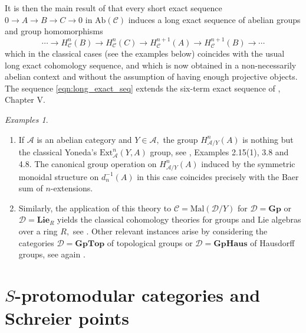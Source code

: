 \documentclass[11pt]{amsart}
\theoremstyle{plain}
\theoremstyle{definition}
\theoremstyle{remark}
\newtheorem{examples}[subsubsection]{Examples}
\begin{document}
It is then the main result of \cite{bourn-rodelo} that every short exact sequence $0\rightarrow A\rightarrow B \rightarrow C \rightarrow 0$ in $\mathrm{Ab}(\mathcal{C})$ induces a long exact sequence of abelian groups and group homomorphisms
\begin{equation}
\label{eqn:long_exact_seq}
\cdots \rightarrow H^{n}_{\mathcal{C}}(B) \rightarrow H^{n}_{\mathcal{C}}(C)\rightarrow H^{n+1}_{\mathcal{C}}(A) \rightarrow H^{n+1}_{\mathcal{C}}(B) \rightarrow \cdots
\end{equation}
which in the classical cases (see the examples below) coincides with the usual long exact cohomology sequence, and which is now obtained in a non-necessarily abelian context and without the assumption of having enough projective objects. The sequence \eqref{eqn:long_exact_seq} extends the six-term exact sequence of \cite{barr}, Chapter V.
\begin{examples}
\label{ex:classical_cohomologies}
\begin{enumerate}
\item If $\mathcal{A}$ is an abelian category and $Y\in\mathcal{A},$ the group $H^n_{\mathcal{A}/Y}(A)$ is nothing but the classical Yoneda's $\mathrm{Ext}^n_{\mathcal{A}}(Y,A)$ group, see \cite{bourn-rodelo}, Examples 2.15(1), 3.8 and 4.8. The canonical group operation on $H^n_{\mathcal{A}/Y}(A)$ induced by the symmetric monoidal structure on $d_n^{-1}(A)$ in this case coincides precisely with the Baer sum of $n$-extensions.
\item Similarly, the application of this theory to $\mathcal{C}=\mathrm{Mal}(\mathcal{D}/Y)$ for $\mathcal{D}=\mathbf{Gp}$ or $\mathcal{D}=\mathbf{Lie}_R$ yields the classical cohomology theories for groups and Lie algebras over a ring $R,$ see \cite{bourn-rodelo}. Other relevant instances arise by considering the categories $\mathcal{D}=\mathbf{GpTop}$ of topological groups or $\mathcal{D}=\mathbf{GpHaus}$ of Hausdorff groups, see again \cite{bourn-rodelo}.
\end{enumerate}
\end{examples}
\section{$S$-protomodular categories and Schreier points} \label{section S-protomodularity}
\end{document}
